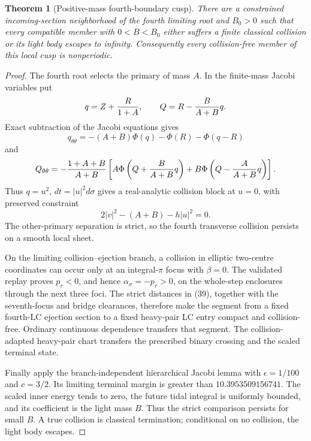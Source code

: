 \documentclass[11pt]{article}
\newtheorem{theorem}{Theorem}
\begin{document}
\begin{theorem}[Positive-mass fourth-boundary cusp]
There are a constrained incoming-section neighborhood of the fourth limiting
root and $B_0>0$ such that every compatible member with $0<B<B_0$ either
suffers a finite classical collision or its light body escapes to infinity.
Consequently every collision-free member of this local cusp is nonperiodic.
\end{theorem}

\begin{proof}
The fourth root selects the primary of mass $A$.  In the finite-mass Jacobi
variables put
\[
 q=Z+{R\over1+A},\qquad Q=R-{B\over A+B}q.
\]
Exact subtraction of the Jacobi equations gives
\[
 q_{\theta\theta}=-(A+B)\Phi(q)-\Phi(R)-\Phi(q-R)
\]
and
\[
 Q_{\theta\theta}=-{1+A+B\over A+B}\left[
 A\Phi\left(Q+{B\over A+B}q\right)
 +B\Phi\left(Q-{A\over A+B}q\right)\right].
\]
Thus $q=u^2$, $dt=|u|^2d\sigma$ gives a real-analytic collision block at
$u=0$, with preserved constraint
\[
 2|v|^2-(A+B)-h|u|^2=0.
\]
The other-primary separation is strict, so the fourth transverse collision
persists on a smooth local sheet.

On the limiting collision--ejection branch, a collision in elliptic
two-centre coordinates can occur only at an integral-$\pi$ focus with
$\beta=0$.  The validated replay proves $p_r<0$, and hence
$\alpha_\sigma=-p_r>0$, on the whole-step enclosures through the next three
foci.  The strict distances in (39), together with the seventh-focus and
bridge clearances, therefore make the segment from a fixed fourth-LC ejection
section to a fixed heavy-pair LC entry compact and collision-free.  Ordinary
continuous dependence transfers that segment.  The collision-adapted
heavy-pair chart transfers the prescribed binary crossing and the scaled
terminal state.

Finally apply the branch-independent hierarchical Jacobi lemma with
$\epsilon=1/100$ and $c=3/2$.  Its limiting terminal margin is greater than
$10.3953509156741$.  The scaled inner energy tends to zero, the future tidal
integral is uniformly bounded, and its coefficient is the light mass $B$.
Thus the strict comparison persists for small $B$.  A true collision is
classical termination; conditional on no collision, the light body escapes.
\end{proof}
\end{document}

